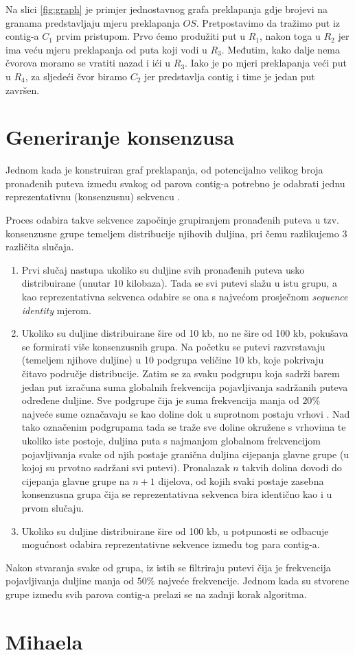 Na slici \ref{fig:graph} je primjer jednostavnog grafa preklapanja gdje brojevi na granama predstavljaju mjeru preklapanja $OS$. Pretpostavimo da tražimo put iz contig-a $C_1$ prvim pristupom. Prvo ćemo produžiti put u $R_1$, nakon toga u $R_2$ jer ima veću mjeru preklapanja od puta koji vodi u $R_3$. Međutim, kako dalje nema čvorova moramo se vratiti nazad i ići u $R_3$. Iako je po mjeri preklapanja veći put u $R_4$, za sljedeći čvor biramo $C_2$ jer predstavlja contig i time je jedan put završen.

\section{Generiranje konsenzusa}
Jednom kada je konstruiran graf preklapanja, od potencijalno velikog broja pronađenih puteva između svakog od parova contig-a potrebno je odabrati jednu  reprezentativnu (konsenzusnu) sekvencu .

Proces odabira takve sekvence započinje grupiranjem pronađenih puteva u tzv. konsenzusne grupe temeljem distribucije njihovih duljina, pri čemu razlikujemo 3 različita slučaja.

\begin{enumerate}
\item Prvi slučaj nastupa ukoliko su duljine svih pronađenih puteva usko distribuirane (unutar 10 kilobaza). Tada se svi putevi slažu u istu grupu, a kao reprezentativna sekvenca odabire se ona s najvećom prosječnom \textit{sequence identity} mjerom.

\item Ukoliko su duljine distribuirane šire od 10 kb, no ne šire od 100 kb, pokušava se formirati više konsenzusnih grupa. Na početku se putevi razvrstavaju (temeljem njihove duljine) u 10 podgrupa veličine 10 kb, koje pokrivaju čitavo područje distribucije. Zatim se za svaku podgrupu koja sadrži barem jedan put izračuna suma globalnih frekvencija pojavljivanja sadržanih puteva određene duljine. Sve podgrupe čija je suma frekvencija manja od $20\%$ najveće sume označavaju se kao doline  dok u suprotnom postaju vrhovi . Nad tako označenim podgrupama tada se traže sve doline okružene s vrhovima te ukoliko iste postoje, duljina puta s najmanjom globalnom frekvencijom pojavljivanja svake od njih postaje granična duljina cijepanja glavne grupe (u kojoj su prvotno sadržani svi putevi). Pronalazak $n$ takvih dolina dovodi do cijepanja glavne grupe na $n + 1$ dijelova, od kojih svaki postaje zasebna konsenzusna grupa čija se reprezentativna sekvenca bira identično kao i u prvom slučaju.

\item Ukoliko su duljine distribuirane šire od 100 kb, u potpunosti se odbacuje mogućnost odabira reprezentativne sekvence između tog para contig-a.
\end{enumerate}
Nakon stvaranja svake od grupa, iz istih se filtriraju putevi čija je frekvencija pojavljivanja duljine manja od $50\%$ najveće frekvencije. Jednom kada su stvorene grupe između svih parova contig-a prelazi se na zadnji korak algoritma.

\section{Mihaela}